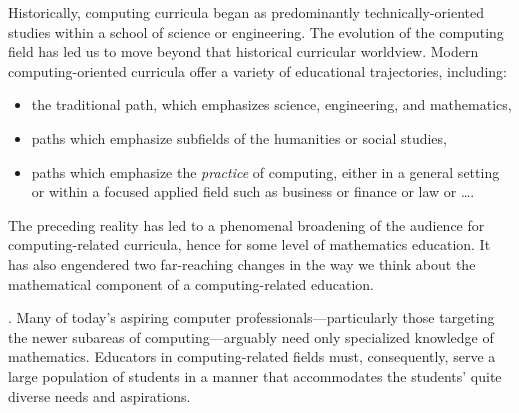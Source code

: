 Historically, computing curricula began as predominantly technically-oriented studies within a school of science or engineering.  The evolution of the computing field has led us to move beyond that historical curricular worldview.  Modern computing-oriented curricula offer a variety of educational trajectories, including:
\begin{itemize}
\item
the traditional path, which emphasizes science, engineering, and mathematics,
\medskip\item
paths which emphasize subfields of the humanities or social studies,
\medskip\item
paths which emphasize the {\em practice} of computing, either in a general setting or within a focused applied field such as business or finance or law or \ldots.
\end{itemize}
The preceding reality has led to a phenomenal broadening of the audience for computing-related curricula, hence for some level of mathematics education.  It has also engendered two far-reaching changes in the way we think about the mathematical component of a computing-related education.

\medskip

.
Many of today's aspiring computer professionals---particularly those targeting the newer subareas of computing---arguably need only specialized knowledge of mathematics.  Educators in computing-related fields must, consequently, serve a large population of students in a manner that accommodates the students' quite diverse needs and aspirations.

\medskip

